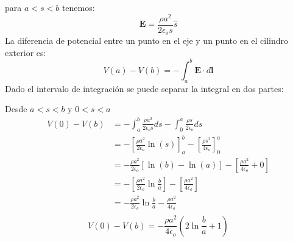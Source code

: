 \documentclass[12pt]{article}
\begin{document}
para \( a < s < b \) tenemos:
\[
\mathbf{E} = \frac{\rho a^2}{2\epsilon_o s }  \hat{s}
\]
La diferencia de potencial entre un punto en el eje y un punto en el cilindro exterior es:
\[
{V(a)}-{V(b)}   = -\int_{a}^{b} \mathbf{E}\cdot d \mathbf{l}  
\]
Dado el intervalo de integración se puede separar la integral en dos partes:

Desde  \(a < s < b\) y  \(0 < s <a\)
\begin{align*}
    {V(0)}-{V(b)}   &= -\int_{a}^{b} \frac{\rho a^2}{2\epsilon_o s } ds - \int_{0}^{a} \frac{\rho s}{2\epsilon_o } ds \\
    &= -\left[\frac{\rho a^2}{2\epsilon_o} \ln(s) \right]_{a}^{b} - \left[\frac{\rho s^2}{4\epsilon_o} \right]_{0}^{a} \\
    &= -\frac{\rho a^2}{2\epsilon_o} \left[\ln(b) -\ln(a)  \right] - \left[\frac{\rho a^2}{4\epsilon_o} + 0 \right] \\
    &= -\left[\frac{\rho a^2}{2\epsilon_o} \ln{\frac{b}{a} } \right] - \left[\frac{\rho a^2}{4\epsilon_o} \right] \\
    &= -\frac{\rho a^2}{2\epsilon_o} \ln{\frac{b}{a} } - \frac{\rho a^2}{4\epsilon_o}\\
\end{align*}
\[
\boxed{V(0)-V(b) =-\frac{\rho a^2}{4\epsilon_o} \left(2\ln{\frac{b}{a} } + 1 \right) }
\]
\end{document}
